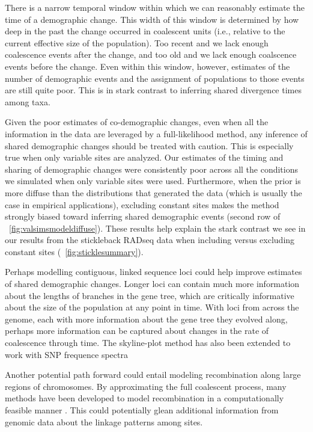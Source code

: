 There is a narrow temporal window within which we can reasonably estimate the
time of a demographic change.
This width of this window is determined by how deep in the past the change
occurred in coalescent units (i.e., relative to the current effective size of
the population).
Too recent and we lack enough coalescence events after the change, and too old
and we lack enough coalscence events before the change.
Even within this window, however, estimates of the number of demographic events
and the assignment of populations to those events are still quite poor.
This is in stark contrast to inferring shared divergence times among taxa.

Given the poor estimates of co-demographic changes, even when all the
information in the data are leveraged by a full-likelihood method, any
inference of shared demographic changes should be treated with caution.
This is especially true when only variable sites are analyzed.
Our estimates of the timing and sharing of demographic changes were
consistently poor across all the conditions we simulated when only variable
sites were used.
Furthermore, when the prior is more diffuse than the distributions that
generated the data (which is usually the case in empirical applications),
excluding constant sites makes the method strongly biased toward
inferring shared demographic events
(second row of \fig{}~\ref{fig:valsimsmodeldiffuse}).
These results help explain the stark contrast we see in our results from the
stickleback RADseq data when including versus excluding constant sites
(\fig{}~\ref{fig:sticklesummary}).

Perhaps modelling contiguous, linked sequence loci could help
improve estimates of shared demographic changes.
Longer loci can contain much more information about the lengths of branches in
the gene tree, which are critically informative about the size of the
population at any point in time.
With loci from across the genome, each with more information about the gene
tree they evolved along,
perhaps more information can be captured about changes in the rate of
coalescence through time.
\citep{Pybus2000,Strimmer2001,OpgenRhein2005,Drummond2005,Heled2008,Minin2008beast,Ho2011,Palacios2012,Palacios2012UAI,Stadler2013,Gill2013,Palacios2014,Lan2015,Karcher2016,Karcher2017,Faulkner2018,Karcher2019}
The skyline-plot method has also been extended to work with SNP frequence spectra \citep{LiuFu2015}

Another potential path forward could entail modeling recombination along large
regions of chromosomes.
By approximating the full coalescent process, many methods have been developed
to model recombination in a computationally feasible manner
\citep{McVean2005,Marjoram2006,Chen2009,Li2011,Sheehan2013,Schiffels2014,Rasmussen2014,Palacios2015}.
This could potentially glean additional information from genomic data about the
linkage patterns among sites.
